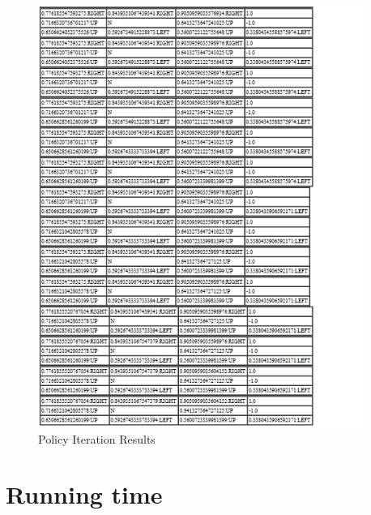 \begin{figure}[h!]
    \label{fig:ValueIterationResults3}
    \begin{center}
        \includegraphics[width=0.95\textwidth]{Figures/Planning_Figure_4.png}
        \caption{Policy Iteration Results}
    \end{center}
\end{figure}


\section{Running time}

